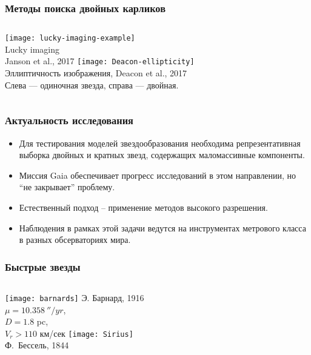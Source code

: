 \begin{frame}%
\frametitle{Методы поиска двойных карликов}
\begin{columns}
	\texttt{[image: lucky-imaging-example]}\\
	{\footnotesize Lucky imaging\\ Janson et al., 2017}
	\texttt{[image: Deacon-ellipticity]}\\
   {\footnotesize Эллиптичность изображения, Deacon et al., 2017\\
   Слева --- одиночная звезда, справа --- двойная.}
\end{columns}
\end{frame}

\begin{frame}%
\frametitle{Актуальность исследования}
{\small
\begin{itemize}
\item Для тестирования моделей звездообразования необходима репрезентативная выборка двойных и кратных звезд, содержащих маломассивные компоненты.
\item Миссия Gaia обеспечивает прогресс исследований в этом направлении, но ``не закрывает'' проблему.
\item Естественный подход -- применение методов высокого разрешения.
\item Наблюдения в рамках этой задачи ведутся на инструментах метрового класса в разных обсерваториях мира.
\end{itemize}
}
\end{frame}


\begin{frame}
\frametitle{Быстрые звезды}
\begin{columns}
	\texttt{[image: barnards]}
	{\footnotesize Э. Барнард, 1916 \\ $\mu = 10.358~''/yr$, \\ $D = 1.8$ pc, \\ $V_r > 110$ км/сек}
	\texttt{[image: Sirius]}\\
   {\footnotesize Ф.~Бессель, 1844}
\end{columns}
\end{frame}

